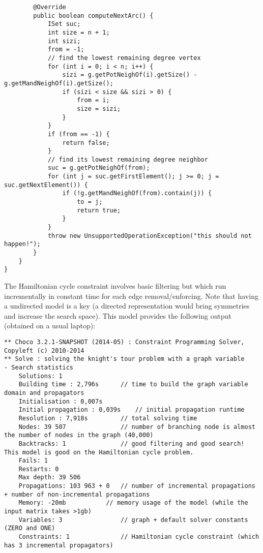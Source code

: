 \documentclass{article}
\begin{document}
\begin{lstlisting}
		@Override
		public boolean computeNextArc() {
			ISet suc;
			int size = n + 1;
			int sizi;
			from = -1;
			// find the lowest remaining degree vertex
			for (int i = 0; i < n; i++) {
				sizi = g.getPotNeighOf(i).getSize() - g.getMandNeighOf(i).getSize();
				if (sizi < size && sizi > 0) {
					from = i;
					size = sizi;
				}
			}
			if (from == -1) {
				return false;
			}
			// find its lowest remaining degree neighbor
			suc = g.getPotNeighOf(from);
			for (int j = suc.getFirstElement(); j >= 0; j = suc.getNextElement()) {
				if (!g.getMandNeighOf(from).contain(j)) {
					to = j;
					return true;
				}
			}
			throw new UnsupportedOperationException("this should not happen!");
		}
	}
}
\end{lstlisting}

The Hamiltonian cycle constraint involves basic filtering but which run incrementally in constant time for each edge removal/enforcing. 
Note that having a undirected model is a key (a directed representation would bring symmetries and increase the search space). 
This model provides the following output (obtained on a usual laptop):
\begin{lstlisting}
** Choco 3.2.1-SNAPSHOT (2014-05) : Constraint Programming Solver, Copyleft (c) 2010-2014
** Solve : solving the knight's tour problem with a graph variable
- Search statistics
	Solutions: 1
	Building time : 2,796s		// time to build the graph variable domain and propagators
	Initialisation : 0,007s
	Initial propagation : 0,039s	// initial propagation runtime
	Resolution : 7,918s			// total solving time
	Nodes: 39 507				// number of branching node is almost the number of nodes in the graph (40,000)
	Backtracks: 1				// good filtering and good search! This model is good on the Hamiltonian cycle problem.
	Fails: 1					
	Restarts: 0
	Max depth: 39 506
	Propagations: 103 963 + 0	// number of incremental propagations + number of non-incremental propagations
	Memory: -20mb			// memory usage of the model (while the input matrix takes >1gb)
	Variables: 3				// graph + default solver constants (ZERO and ONE)
	Constraints: 1				// Hamiltonian cycle constraint (which has 3 incremental propagators)
\end{lstlisting}
\end{document}

